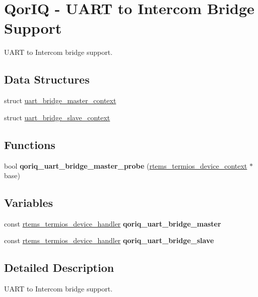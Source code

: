 \hypertarget{group__QorIQUartBridge}{}\section{Qor\+IQ -\/ U\+A\+RT to Intercom Bridge Support}
\label{group__QorIQUartBridge}


U\+A\+RT to Intercom bridge support.  


\subsection*{Data Structures}
\begin{DoxyCompactItemize}
\item 
struct \mbox{\hyperlink{structuart__bridge__master__context}{uart\+\_\+bridge\+\_\+master\+\_\+context}}
\item 
struct \mbox{\hyperlink{structuart__bridge__slave__context}{uart\+\_\+bridge\+\_\+slave\+\_\+context}}
\end{DoxyCompactItemize}
\subsection*{Functions}
\begin{DoxyCompactItemize}
\item 
\mbox{\label{group__QorIQUartBridge_gab341579850afc2b49937ba400327bd72}} 
bool {\bfseries qoriq\+\_\+uart\+\_\+bridge\+\_\+master\+\_\+probe} (\mbox{\hyperlink{structrtems__termios__device__context}{rtems\+\_\+termios\+\_\+device\+\_\+context}} $\ast$base)
\end{DoxyCompactItemize}
\subsection*{Variables}
\begin{DoxyCompactItemize}
\item 
\mbox{\label{group__QorIQUartBridge_ga015d44072433f95d44802a6d9f8b6dc5}} 
const \mbox{\hyperlink{structrtems__termios__device__handler}{rtems\+\_\+termios\+\_\+device\+\_\+handler}} {\bfseries qoriq\+\_\+uart\+\_\+bridge\+\_\+master}
\item 
\mbox{\label{group__QorIQUartBridge_ga02f4a12de7f95b937655c419196be1ef}} 
const \mbox{\hyperlink{structrtems__termios__device__handler}{rtems\+\_\+termios\+\_\+device\+\_\+handler}} {\bfseries qoriq\+\_\+uart\+\_\+bridge\+\_\+slave}
\end{DoxyCompactItemize}


\subsection{Detailed Description}
U\+A\+RT to Intercom bridge support. 


